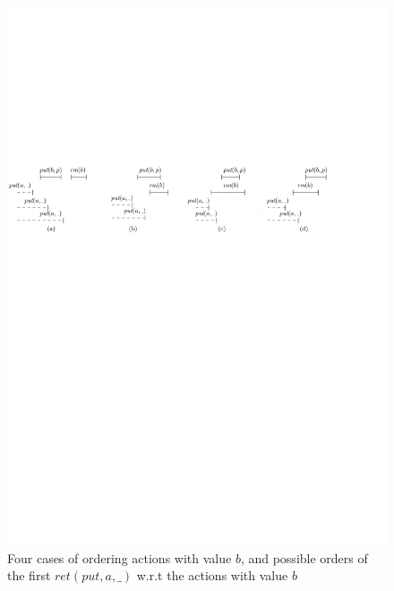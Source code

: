 \begin{figure}[htbp]
  \centering
  \includegraphics[width=1 \textwidth]{figures/PIC_HIS_PQ1Lar-fouCase.pdf}
  \caption{Four cases of ordering actions with value $b$, and possible orders of the first $\textit{ret}(\textit{put},a,\_)$ w.r.t the actions with value $b$}
  \label{fig:executions APQ1Lar-1 in paper}
\end{figure}


%



